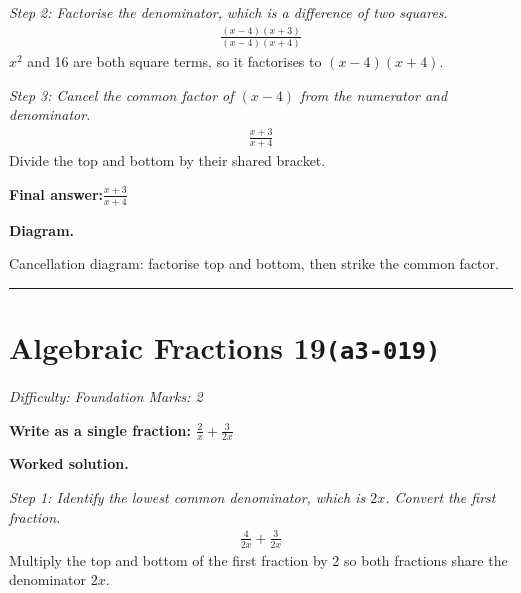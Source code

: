 \documentclass[11pt]{article}
\newcommand{\question}[1]{\par\medskip\noindent\textbf{#1}\par}
\begin{document}
\textit{Step 2: Factorise the denominator, which is a difference of two squares.}
\[\begin{gathered}
\frac{(x - 4)(x + 3)}{(x - 4)(x + 4)}
\end{gathered}\]
\( x^2 \) and 16 are both square terms, so it factorises to \( (x - 4)(x + 4) \).

\textit{Step 3: Cancel the common factor of \( (x - 4) \) from the numerator and denominator.}
\[\begin{gathered}
\frac{x + 3}{x + 4}
\end{gathered}\]
Divide the top and bottom by their shared bracket.

\begin{answerbox}
\textbf{Final answer:}\quad \(\displaystyle \frac{x + 3}{x + 4}\)
\end{answerbox}
\textbf{Diagram.}

\begin{center}
\end{center}
\small Cancellation diagram: factorise top and bottom, then strike the common factor.\normalsize

\medskip\hrule

\section*{Algebraic Fractions 19\quad\small\texttt{(a3-019)}}
\textit{Difficulty: Foundation \quad\textbar\quad Marks: 2}

\question{Write as a single fraction: \( \frac{2}{x} + \frac{3}{2x} \)}

\textbf{Worked solution.}

\textit{Step 1: Identify the lowest common denominator, which is \( 2x \). Convert the first fraction.}
\[\begin{gathered}
\frac{4}{2x} + \frac{3}{2x}
\end{gathered}\]
Multiply the top and bottom of the first fraction by 2 so both fractions share the denominator \( 2x \).
\end{document}
